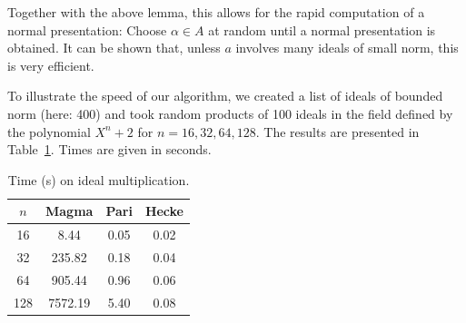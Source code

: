 \documentclass{sig-alternate-05-2015}
\begin{document}
Together with the above lemma, this allows for the rapid computation of a
normal presentation: Choose $\alpha\in A$ at random until a normal presentation
is obtained. It can be shown that, unless $a$ involves many ideals of small
norm, this is very efficient.

To illustrate the speed of our algorithm, we created a list of ideals of bounded norm (here: 400) and
took random products of 100 ideals in the field
defined by the polynomial $X^n + 2$ for $n=16, 32, 64, 128$.
The results are presented in Table~\ref{tab:ideals}.
Times are given in seconds.

\begin{table}
\center
\caption{Time (s) on ideal multiplication.}
\begin{small}
\setlength{\tabcolsep}{2.0pt}
\renewcommand{\arraystretch}{1.08}
\begin{tabular}{c c c c} \hline
$n$ & Magma & Pari & Hecke  \\ \hline
     16  &  8.44 & 0.05 & 0.02   \\
     32  &   235.82  &   0.18   &     0.04 \\
     64  &   905.44  &     0.96   &     0.06    \\
    128  &   7572.19   &     5.40    &       0.08 
\end{tabular}
\label{tab:ideals}
\end{small}
\end{table}

\end{document}
